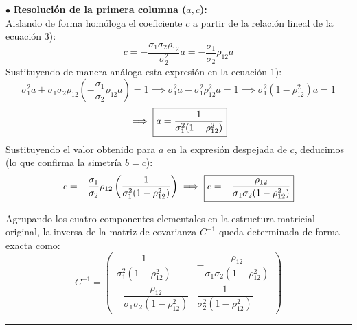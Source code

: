 \begin{ejemplo}[Deducción Explícita para la Dimensión $n = 2$]
\noindent $\bullet$ \textbf{Resolución de la primera columna ($a, c$):} \\
Aislando de forma homóloga el coeficiente $c$ a partir de la relación lineal de la ecuación 3):
\[
c = -\frac{\sigma_1 \sigma_2 \rho_{12}}{\sigma_2^2} a = -\frac{\sigma_1}{\sigma_2} \rho_{12} a
\]
Sustituyendo de manera análoga esta expresión en la ecuación 1):
\[
\sigma_1^2 a + \sigma_1 \sigma_2 \rho_{12} \left( -\frac{\sigma_1}{\sigma_2} \rho_{12} a \right) = 1 \implies \sigma_1^2 a - \sigma_1^2 \rho_{12}^2 a = 1 \implies \sigma_1^2 (1 - \rho_{12}^2) a = 1
\]
\[
\implies \framebox{$\displaystyle a = \frac{1}{\sigma_1^2 (1 - \rho_{12}^2)}$}
\]
Sustituyendo el valor obtenido para $a$ en la expresión despejada de $c$, deducimos (lo que confirma la simetría $b=c$):
\[
c = -\frac{\sigma_1}{\sigma_2} \rho_{12} \left( \frac{1}{\sigma_1^2 (1 - \rho_{12}^2)} \right) \implies \framebox{$\displaystyle c = -\frac{\rho_{12}}{\sigma_1 \sigma_2 (1 - \rho_{12}^2)}$}
\]

\vspace{0.4cm}

\noindent Agrupando los cuatro componentes elementales en la estructura matricial original, la inversa de la matriz de covarianza $C^{-1}$ queda determinada de forma exacta como:
\[
C^{-1} = \begin{pmatrix} \dfrac{1}{\sigma_1^2 (1 - \rho_{12}^2)} & -\dfrac{\rho_{12}}{\sigma_1 \sigma_2 (1 - \rho_{12}^2)} \\ -\dfrac{\rho_{12}}{\sigma_1 \sigma_2 (1 - \rho_{12}^2)} & \dfrac{1}{\sigma_2^2 (1 - \rho_{12}^2)} \end{pmatrix}
\]

\strut
\hfill \rule{\textwidth}{0.5pt} \hfill
\strut


\end{ejemplo}
